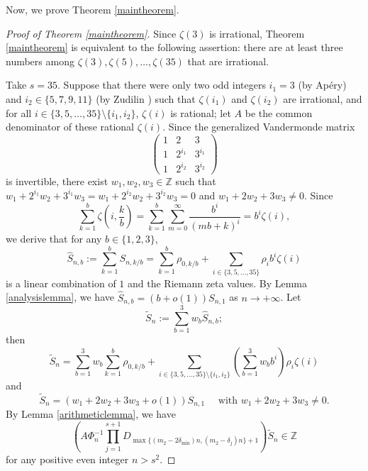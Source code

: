 \documentclass[11pt]{amsart}
\numberwithin{equation}{section}
\begin{document}
\bigskip

Now, we prove Theorem \ref{maintheorem}.
\begin{proof}[Proof of Theorem \ref{maintheorem}]
Since $\zeta(3)$ is irrational, Theorem \ref{maintheorem} is equivalent to the following assertion: there are at least three numbers among $\zeta(3),\zeta(5),\ldots,\zeta(35)$ that are irrational.

Take $s = 35$. Suppose that there were only two odd integers $i_1 = 3$ (by Ap{\' e}ry) and $i_2 \in \{ 5,7,9,11 \}$ (by Zudilin \cite{Zu01}) such that $\zeta(i_1)$ and $\zeta(i_2)$ are irrational, and for all $i \in \{ 3,5,\ldots,35 \} \setminus\{ i_1,i_2\}$, $\zeta(i)$ is rational; let $A$ be the common denominator of these rational $\zeta(i)$. Since the generalized Vandermonde matrix
\[\left(\begin{array}{rrr}
1 & 2~ & 3~ \\
1 & 2^{i_1} & 3^{i_1} \\
1 & 2^{i_2} & 3^{i_2}
\end{array}\right)
\]
is invertible, there exist $w_1,w_2,w_3 \in \mathbb{Z}$ such that $w_1+2^{i_1}w_2 + 3^{i_1}w_3 = w_1+2^{i_2}w_2+3^{i_2}w_3 = 0$ and $w_1+2w_2+3w_3 \neq 0$. Since
\[ \sum_{k=1}^{b} \zeta\left(i, \frac{k}{b}\right)=\sum_{k=1}^{b} \sum_{m=0}^{\infty} \frac{b^{i}}{(m b+k)^{i}}=b^{i} \zeta(i), \]
we derive that for any $b \in \{ 1,2,3 \}$,
\[ \widehat{S}_{n, b}:=\sum_{k=1}^{b} S_{n, k / b}=\sum_{k=1}^{b} \rho_{0, k / b}+\sum_{i \in \{ 3,5,\ldots,35 \}} \rho_{i} b^{i} \zeta(i) \]
is a linear combination of $1$ and the Riemann zeta values. By Lemma \ref{analysislemma}, we have $\widehat{S}_{n, b} = (b+o(1))S_{n,1}$ as $n \rightarrow +\infty$. Let
\[ \widetilde{S}_{n}:=\sum_{b=1}^{3} w_{b} \widehat{S}_{n, b}; \]
then
\[ \widetilde{S}_{n}=\sum_{b=1}^{3} w_{b} \sum_{k=1}^{b} \rho_{0, k / b}+\sum_{i \in \{ 3,5,\ldots,35 \} \setminus\{ i_1,i_2\}}\left(\sum_{b=1}^{3} w_{b} b^{i}\right) \rho_{i} \zeta(i) \]
and
\begin{equation}\label{widetilde_S_n}
\widetilde{S}_{n}= (w_1+2w_2+3w_3+o(1))S_{n,1} \quad\text{~with~} w_1+2w_2+3w_3 \neq 0.
\end{equation}
By Lemma \ref{arithmeticlemma}, we have
\begin{equation}\label{APhiDSinZ}
\left( A\Phi_{n}^{-1}  \prod_{j=1}^{s+1} D_{\max\{ (m_2-2\delta_{\min})n, (m_2 - \delta_j)n \}+1} \right) \widetilde{S}_{n} \in \mathbb{Z}
\end{equation}
for any positive even integer $n>s^2$.


\end{proof}
\end{document}
